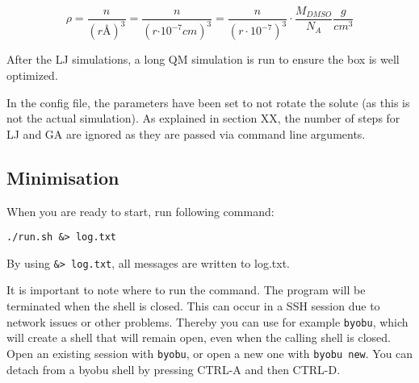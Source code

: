 \begin{equation} \label{eqn:density}
\rho = \dfrac{n}{(r \si{\angstrom})^3} = \dfrac{n}{(r \si{\cdot 10^{-7} cm})^3} 
=
\dfrac{n}{(r \cdot 10^{-7})^3} \cdot \dfrac{M_{DMSO}}{N_A} \dfrac{g}{cm^3}
\end{equation}

After the LJ simulations, a long QM simulation is run to ensure the box is well 
optimized.

In the config file, the parameters have been set to not rotate the solute (as 
this is not the actual simulation). As explained in section XX, the number of 
steps for LJ and GA are ignored as they are passed via command line arguments.

\subsection{Minimisation}\label{subs:minimisation}
When you are ready to start, run following command:

\begin{lstlisting}[caption=runmin]
./run.sh &> log.txt
\end{lstlisting}

By using \verb|&> log.txt|, all messages are written to log.txt.

It is important to note where to run the command. The program will be 
terminated when the shell is closed. This can occur in a SSH session due to 
network issues or other problems. Thereby you can use for example \verb|byobu|, 
which will create a shell that will remain open, even when the calling shell is 
closed. Open an existing session with \verb|byobu|, or open a new one with 
\verb|byobu new|. You can detach from a byobu shell by pressing CTRL-A and then 
CTRL-D.